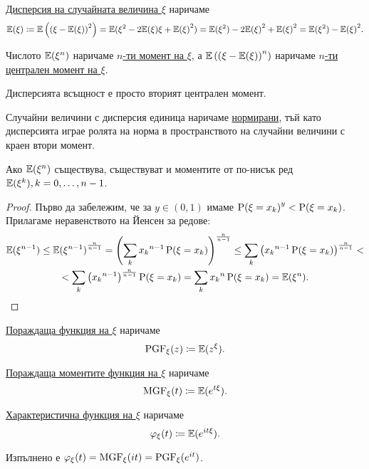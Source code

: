 \documentclass[numbers=endperiod, DIV=15, bibliography=totocnumbered]{scrartcl}
\begin{document}
\begin{definition}
  \underline{Дисперсия на случайната величина $\xi$} наричаме
  \begin{displaymath}
    \mathbb{E}(\xi)
    \coloneqq
    \mathbb{E} \left({(\xi - \mathbb{E}(\xi))}^2 \right)
    =
    \mathbb{E}(\xi^2 - 2 \mathbb{E}(\xi) \xi + {\mathbb{E}(\xi)}^2)
    =
    \mathbb{E}(\xi^2) - 2 {\mathbb{E}(\xi)}^2 + {\mathbb{E}(\xi)}^2
    =
    \mathbb{E}(\xi^2) - {\mathbb{E}(\xi)}^2.
  \end{displaymath}

  Числото $\mathbb{E}(\xi^n)$ наричаме \underline{$n$-ти момент на $\xi$}, а $\mathbb{E} \left( {(\xi - \mathbb{E}(\xi))}^n \right)$ наричаме \underline{$n$-ти централен момент на $\xi$}.

  Дисперсията всъщност е просто вторият централен момент.

  Случайни величини с дисперсия единица наричаме \underline{нормирани}, тъй като дисперсията играе ролята на норма в пространството на случайни величини с краен втори момент.
\end{definition}

\begin{proposition}
  Ако $\mathbb{E}(\xi^n)$ съществува, съществуват и моментите от по-нисък ред $\mathbb{E}(\xi^k), k = 0, \ldots, n - 1$.
\end{proposition}
\begin{proof}
  Първо да забележим, че за $y \in (0, 1)$ имаме ${\operatorname{P}(\xi = x_k)}^y < \operatorname{P}(\xi = x_k)$. Прилагаме неравенството на Йенсен за редове:
  \begin{multline*}
    \mathbb{E}(\xi^{n-1})
    \leq
    {\mathbb{E}(\xi^{n-1})}^{\frac n {n-1}}
    =
    {\left( \sum_k {x_k}^{n-1} \operatorname{P}(\xi = x_k) \right)}^{\frac n {n-1}}
    \leq
    \sum_k {\left({x_k}^{n-1} \operatorname{P}(\xi = x_k) \right)}^{\frac n {n-1}}
    < \\ <
    \sum_k {\left({x_k}^{n-1}\right)}^{\frac n {n-1}} \operatorname{P}(\xi = x_k)
    =
    \sum_k {x_k}^n \operatorname{P}(\xi = x_k)
    =
    \mathbb{E}(\xi^n).
  \end{multline*}
\end{proof}

\begin{definition}
  \underline{Пораждаща функция на $\xi$} наричаме
  \begin{displaymath}
    \operatorname{PGF}_\xi (z) \coloneqq \mathbb{E}(z^\xi).
  \end{displaymath}

  \underline{Пораждаща моментите функция на $\xi$} наричаме
  \begin{displaymath}
    \operatorname{MGF}_\xi (t) \coloneqq \mathbb{E}(e^{t\xi}).
  \end{displaymath}

  \underline{Характеристична функция на $\xi$} наричаме
  \begin{displaymath}
    \varphi_\xi (t) \coloneqq \mathbb{E}(e^{it\xi}).
  \end{displaymath}

  Изпълнено е $\varphi_\xi(t) = \operatorname{MGF}_\xi(it) = \operatorname{PGF}_\xi(e^{it})$.
\end{definition}
\end{document}

